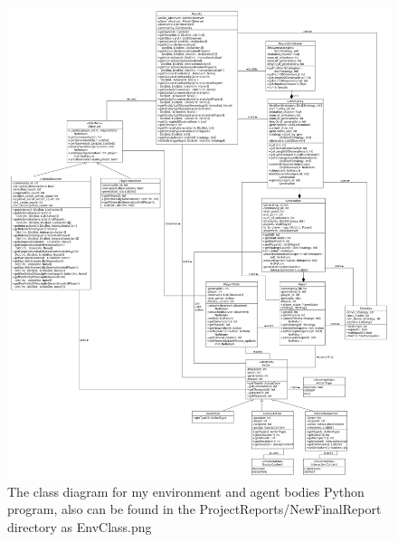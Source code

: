 \documentclass[]{final_report}
\begin{document}
\begin{figure}
	\begin{flushleft}
	\includegraphics[width=\textwidth]{EnvClass.png}
	\caption{The class diagram for my environment and agent bodies Python program, also can be found in the ProjectReports/NewFinalReport directory as EnvClass.png}
	\label{fig:class}
	\end{flushleft}
\end{figure}
\end{document}
